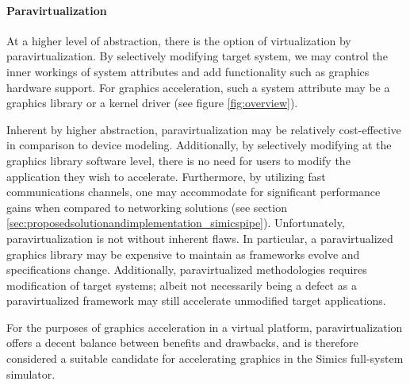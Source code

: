 \paragraph{Paravirtualization}
\label{par:previousresearch_graphicsvirtualization_paravirtualization}
At a higher level of abstraction, there is the option of virtualization by paravirtualization.
By selectively modifying target system, we may control the inner workings of system attributes and add functionality such as graphics hardware support.
For graphics acceleration, such a system attribute may be a graphics library or a kernel driver (see figure \ref{fig:overview}).

Inherent by higher abstraction, paravirtualization may be relatively cost-effective in comparison to device modeling.
Additionally, by selectively modifying at the graphics library software level, there is no need for users to modify the application they wish to accelerate.
Furthermore, by utilizing fast communications channels, one may accommodate for significant performance gains when compared to networking solutions (see section \ref{sec:proposedsolutionandimplementation_simicspipe}).
Unfortunately, paravirtualization is not without inherent flaws.
In particular, a paravirtualized graphics library may be expensive to maintain as frameworks evolve and specifications change.
Additionally, paravirtualized methodologies requires modification of target systems; albeit not necessarily being a defect as a paravirtualized framework may still accelerate unmodified target applications.

For the purposes of graphics acceleration in a virtual platform, paravirtualization offers a decent balance between benefits and drawbacks, and is therefore considered a suitable candidate for accelerating graphics in the Simics full-system simulator.


